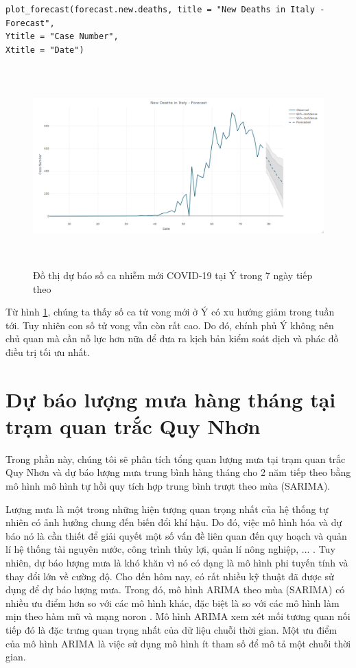 \documentclass[12pt, a4paper,oneside]{book}
\theoremstyle{definition}
\begin{document}
\begin{lstlisting}
plot_forecast(forecast.new.deaths, title = "New Deaths in Italy - Forecast",
Ytitle = "Case Number",
Xtitle = "Date")
\end{lstlisting}
\begin{figure}[!htb]
	\centering
	\includegraphics[width=1\linewidth,height=7.7cm]{anh/A8}
	\vskip-4mm 
	\caption{Đồ thị dự báo số ca nhiễm mới COVID-19 tại Ý trong 7 ngày tiếp theo}  
	\label{A8}
\end{figure}
Từ hình \ref{A8}, chúng ta thấy số ca tử vong mới ở Ý có xu hướng giảm trong tuần tới. Tuy nhiên con số tử vong vẫn còn rất cao. Do đó, chính phủ Ý không nên chủ quan mà cần nỗ lực hơn nữa để đưa ra kịch bản kiểm soát dịch và phác đồ điều trị tối ưu nhất.

\section{Dự báo lượng mưa hàng tháng tại trạm quan trắc Quy Nhơn}
Trong phần này, chúng tôi sẽ phân tích tổng quan lượng mưa tại trạm quan trắc Quy Nhơn và dự báo lượng mưa trung bình hàng tháng cho 2 năm tiếp theo bằng mô hình mô hình tự hồi quy tích hợp trung bình trượt theo mùa (SARIMA).

Lượng mưa là một trong những hiện tượng quan trọng nhất của hệ thống tự nhiên có ảnh hưởng chung đến biến đổi khí hậu. Do đó, việc mô hình hóa và dự báo nó là cần thiết để giải quyết một số vấn đề liên quan đến quy hoạch và quản lí hệ thống tài nguyên nước, công trình thủy lợi, quản lí nông nghiệp, ... . Tuy nhiên, dự báo lượng mưa là khó khăn vì nó có dạng là mô hình phi tuyến tính và thay đổi lớn về cường độ. Cho đến hôm nay, có rất nhiều kỹ thuật đã được sử dụng để dự báo lượng mưa. Trong đó, mô hình ARIMA theo mùa (SARIMA) có nhiều ưu điểm hơn so với các mô hình khác, đặc biệt là so với các mô hình làm mịn theo hàm mũ và mạng noron \cite{17}. Mô hình ARIMA xem xét mối tương quan nối tiếp đó là đặc trưng quan trọng nhất của dữ liệu chuỗi thời gian. Một ưu điểm của mô hình ARIMA là việc sử dụng mô hình ít tham số để mô tả một chuỗi thời gian.
\end{document}
